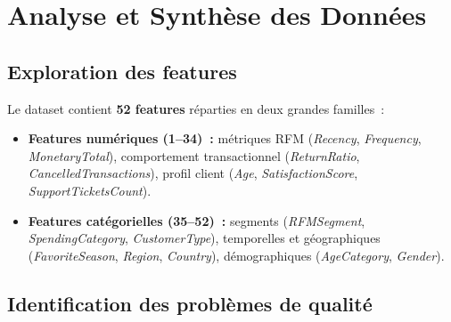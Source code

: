 \documentclass[12pt, a4paper]{article}
\newcommand{\feat}[1]{\textit{\textcolor{accent}{#1}}}
\begin{document}
\section{Analyse et Synthèse des Données}

\subsection{Exploration des features}

Le dataset contient \textbf{52 features} réparties en deux grandes familles~:

\begin{itemize}
  \item \textbf{Features numériques (1–34)~:} métriques RFM (\feat{Recency},
        \feat{Frequency}, \feat{MonetaryTotal}), comportement transactionnel
        (\feat{ReturnRatio}, \feat{CancelledTransactions}), profil client
        (\feat{Age}, \feat{SatisfactionScore}, \feat{SupportTicketsCount}).
  \item \textbf{Features catégorielles (35–52)~:} segments
        (\feat{RFMSegment}, \feat{SpendingCategory}, \feat{CustomerType}),
        temporelles et géographiques (\feat{FavoriteSeason}, \feat{Region},
        \feat{Country}), démographiques (\feat{AgeCategory}, \feat{Gender}).
\end{itemize}

\subsection{Identification des problèmes de qualité}
\end{document}
